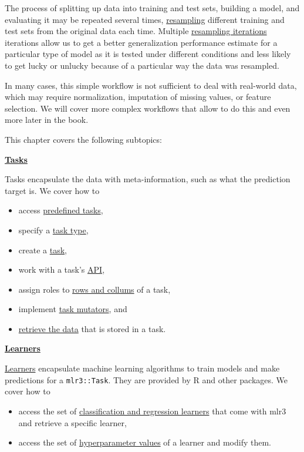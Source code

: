 \documentclass[
  11pt,
  parskip=half,
  DIV=calc,
  BCOR=10mm,
  x11names]{scrbook}
\providecommand{\tightlist}{%
  \setlength{\itemsep}{0pt}\setlength{\parskip}{0pt}}
\begin{document}
The process of splitting up data into training and test sets, building a model, and evaluating it may be repeated several times, \protect\hyperlink{resampling}{resampling} different training and test sets from the original data each time.
Multiple \protect\hyperlink{resampling}{resampling iterations} iterations allow us to get a better generalization performance estimate for a particular type of model as it is tested under different conditions and less likely to get lucky or unlucky because of a particular way the data was resampled.

In many cases, this simple workflow is not sufficient to deal with real-world data, which may require normalization, imputation of missing values, or feature selection.
We will cover more complex workflows that allow to do this and even more later in the book.

This chapter covers the following subtopics:

\protect\hyperlink{tasks}{\textbf{Tasks}}

Tasks encapsulate the data with meta-information, such as what the prediction target is.
We cover how to

\begin{itemize}
\tightlist
\item
  access \protect\hyperlink{tasks-predefined}{predefined tasks},
\item
  specify a \protect\hyperlink{tasks-types}{task type},
\item
  create a \protect\hyperlink{tasks-creation}{task},
\item
  work with a task's \protect\hyperlink{tasks-api}{API},
\item
  assign roles to \protect\hyperlink{tasks-roles}{rows and collums} of a task,
\item
  implement \protect\hyperlink{tasks-mutators}{task mutators}, and
\item
  \protect\hyperlink{tasks-retrieved}{retrieve the data} that is stored in a task.
\end{itemize}

\protect\hyperlink{learners}{\textbf{Learners}}

\protect\hyperlink{learners}{Learners} encapsulate machine learning algorithms to train models and make predictions for a \texttt{mlr3::Task}.
They are provided by R and other packages.
We cover how to

\begin{itemize}
\tightlist
\item
  access the set of \protect\hyperlink{learners-predefined}{classification and regression learners} that come with mlr3 and retrieve a specific learner,
\item
  access the set of \protect\hyperlink{learners-predefined}{hyperparameter values} of a learner and modify them.
\end{itemize}
\end{document}
